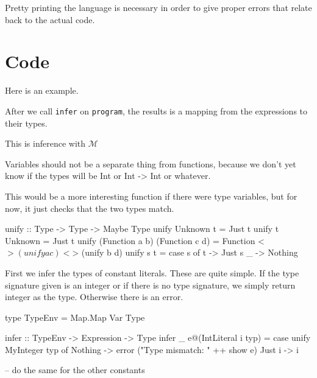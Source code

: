 \documentclass[12pt]{article}
\newcommand{\M}{$\mathcal{M}$}
\begin{document}
Pretty printing the language is necessary in order to give proper errors that
relate back to the actual code.

\begin{code}

\end{code}

\section{Code}

Here is an example.
\begin{code}



\end{code}

After we call \texttt{infer} on \texttt{program}, the results is a mapping
from the expressions to their types.

This is inference with \M

Variables should not be a separate thing from functions, because
we don't yet know if the types will be Int or Int -> Int or whatever.

\begin{code}

\end{code}

This would be a more interesting function if there were type variables,
but for now, it just checks that the two types match.
\begin{code}
unify :: Type -> Type -> Maybe Type
unify Unknown t = Just t
unify t Unknown = Just t
unify (Function a b) (Function c d) =
  Function <$> (unify a c) <$> (unify b d)
unify s t =
  case s of
    t -> Just s
    _ -> Nothing
\end{code}


First we infer the types of constant literals.  These are quite simple.
If the type signature given is an integer or if there is no type
signature, we simply return integer as the type.
Otherwise there is an error.
\begin{code}
type TypeEnv = Map.Map Var Type

infer :: TypeEnv -> Expression -> Type
infer _ e@(IntLiteral i typ) =
  case unify MyInteger typ of
    Nothing -> error ("Type mismatch: " ++ show e)
    Just i -> i

-- do the same for the other constants
\end{code}
\end{document}
